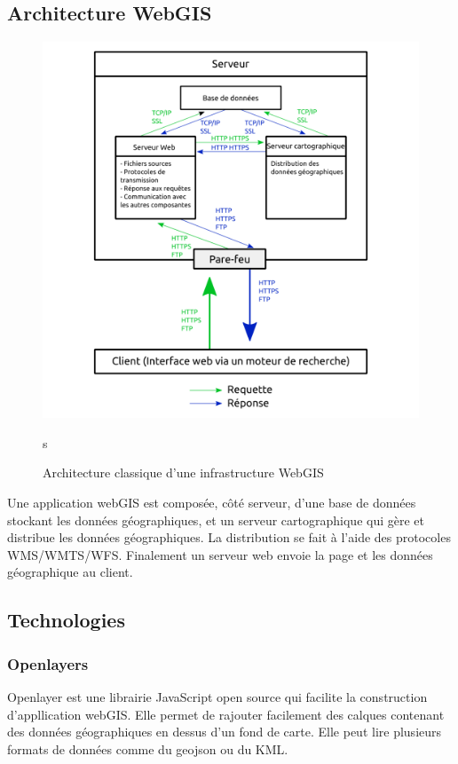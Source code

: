\documentclass[
    iai, %
    il, %
]{heig-tb}
\begin{document}
\subsection{Architecture WebGIS}

\begin{figure}[h]
    \centering
    \includegraphics[scale=0.1]{webGIS_archi.png}
    \caption{Architecture classique d'une infrastructure WebGIS}s
\end{figure}

Une application webGIS \cite{architecture-webgis} est composée, côté serveur, d'une base de données stockant les données géographiques, et un serveur cartographique qui gère et distribue les données géographiques.
La distribution se fait à l'aide des protocoles WMS/WMTS/WFS.
Finalement un serveur web envoie la page et les données géographique au client.

\subsection{Technologies }

\subsubsection{Openlayers}
Openlayer \cite{openlayers} est une librairie JavaScript open source qui facilite la construction d'appllication webGIS.
Elle permet de rajouter facilement des calques contenant des données géographiques en dessus d'un fond de carte.
Elle peut lire plusieurs formats de données comme du geojson ou du KML.
\end{document}
